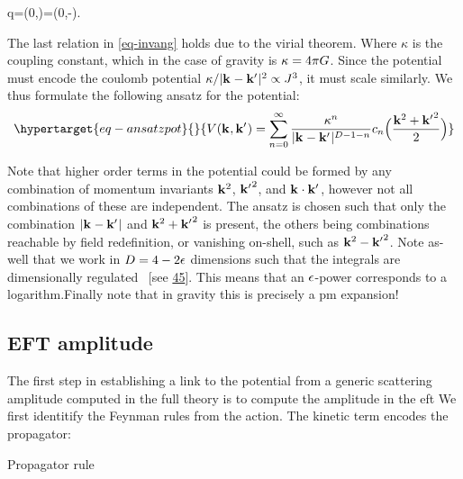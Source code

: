 \documentclass[
  10pt,
  a4paper,
  DIV=11,
  numbers=noendperiod,
  oneside]{scrreprt}
\let\[\relax \let\]\relax %
\DeclareRobustCommand{\[}{\begin{equation}}
\DeclareRobustCommand{\]}{\end{equation}}
\begin{document}
\[
q=(0,)=(0,-).
\]

The last relation in \ref{eq-invang} holds due to the virial theorem.
Where \(\kappa\) is the coupling constant, which in the case of gravity
is \(\kappa=4\pi G\). Since the potential must encode the coulomb
potential \(\kappa/\vert\mathbf{{k}}_{}-\mathbf{{k'}}_{} \vert^2\propto J^3\), it must scale
similarly. We thus formulate the following ansatz for the potential:
\begin{equation}\protect\hypertarget{eq-ansatzpot}{}{
\pot(\tv{k},\tv{k'})=\sum_{n=0}^\infty \frac{\kappa^n}{\abs{\tv{k}-\tv{k'}}^{\Dim-1-n}} c_n\pa[\Big]{\frac{\tv{k}^2+\tv{k'}^2}{2}}
}\label{eq-ansatzpot}\end{equation}

Note that higher order terms in the potential could be formed by any
combination of momentum invariants \(\mathbf{{k}}_{}^2\), \(\mathbf{{k'}}_{}^2\), and
\(\mathbf{{k}}_{}\cdot\mathbf{{k'}}_{}\), however not all combinations of these are
independent. The ansatz is chosen such that only the combination
\(\vert\mathbf{{k}}_{}-\mathbf{{k'}}_{} \vert\) and \(\mathbf{{k}}_{}^2+\mathbf{{k'}}_{}^2\) is present, the
others being combinations reachable by field redefinition, or vanishing
on-shell, such as \(\mathbf{{k}}_{}^2-\mathbf{{k'}}_{}^2\). Note as-well that we work in
\(D=4-2\epsilon\) dimensions such that the integrals are dimensionally
regulated ~{[}see \protect\hyperlink{ref-tHooft:1972tcz}{45}{]}. This
means that an \(\epsilon\)-power corresponds to a
logarithm.Finally
note that in gravity this is precisely a \gls{pm} expansion!

\hypertarget{eft-amplitude}{%
\subsection{EFT amplitude}\label{eft-amplitude}}

The first step in establishing a link to the potential from a generic
scattering amplitude computed in the full theory is to compute the
amplitude in the \gls{eft} We first identitify the Feynman rules from
the action. The kinetic term encodes the propagator:

\hypertarget{fig-propagator}{}
{
\makeatletter
\def\LT@makecaption#1#2#3{%
  \noalign{\smash{\hbox{\kern\textwidth\rlap{\kern\marginparsep
  \parbox[t]{\marginparwidth}{%
    \footnotesize{%
      \vspace{(1.1\baselineskip)}
    #1{#2: }\ignorespaces #3}}}}}}%
    }
\makeatother



\label{fig-propagator}Propagator rule

}
\end{document}
